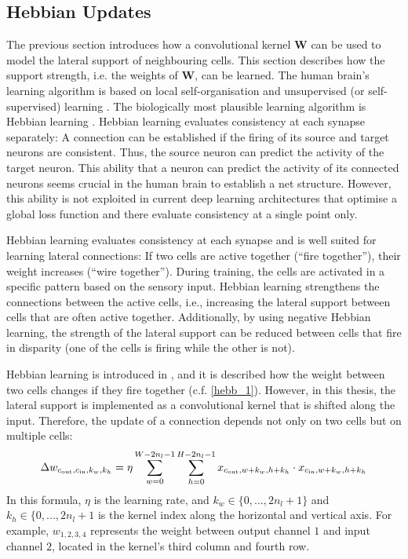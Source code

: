 \subsection{Hebbian Updates}
The previous section introduces how a convolutional kernel $\boldsymbol{W}$ can be used to model the lateral support of neighbouring cells.
This section describes how the support strength, i.e. the weights of $\boldsymbol{W}$, can be learned.
The human brain's learning algorithm is based on local self-organisation and unsupervised (or self-supervised) learning . The biologically most plausible learning algorithm is Hebbian learning .
Hebbian learning evaluates consistency at each synapse separately: A connection can be established if the firing of its source and target neurons are consistent. Thus, the source neuron can predict the activity of the target neuron. This ability that a neuron can predict the activity of its connected neurons seems crucial in the human brain to establish a net structure. However, this ability is not exploited in current deep learning architectures that optimise a global loss function and there evaluate consistency at a single point only.

Hebbian learning evaluates consistency at each synapse and is well suited for learning lateral connections: If two cells are active together (``fire together''), their weight increases (``wire together''). During training, the cells are activated in a specific pattern based on the sensory input. Hebbian learning strengthens the connections between the active cells, i.e., increasing the lateral support between cells that are often active together. Additionally, by using negative Hebbian learning, the strength of the lateral support can be reduced between cells that fire in disparity (one of the cells is firing while the other is not).

Hebbian learning is introduced in , and it is described how the weight between two cells changes if they fire together (c.f. \eqref{hebb_1}).
However, in this thesis, the lateral support is implemented as a convolutional kernel that is shifted along the input.
Therefore, the update of a connection depends not only on two cells but on multiple cells:
%
\begin{align}\eqlbl{hebbu_1}
	\Delta w_{c_{\text{out}}, c_{\text{in}},k_w,k_h} = \eta \sum_{w = 0}^{W - 2n_l - 1} \sum_{h = 0}^{H - 2n_l - 1} x_{c_{\text{out}},w+k_w,h+k_h} \cdot x_{c_{\text{in}},w+k_w,h+k_h}
\end{align}
%
In this formula, $\eta$ is the learning rate, and $k_w \in \{0, ..., 2n_l+1\}$ and $k_h\in \{0, ..., 2n_l+1$ is the kernel index along the horizontal and vertical axis. 
For example, $w_{1, 2,3,4}$ represents the weight between output channel $1$ and input channel $2$, located in the kernel's third column and fourth row.

